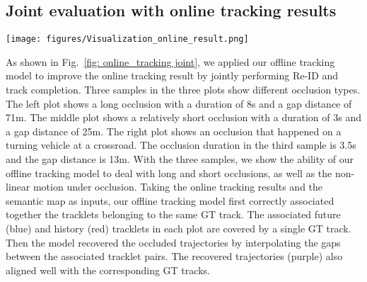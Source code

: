 \documentclass{article} \usepackage{iclr2023_conference,times}
\begin{document}
\subsection{Joint evaluation with online tracking results}
\begin{figure*}[htb!]
\centering
\texttt{[image: figures/Visualization\_online\_result.png]}
\caption{Qualitative results of the offline tracking model. In each sample, GT boxes are plotted as rectangles. Each GT track is represented by a unique color. To separate the output of the model from the GT tracks, we use arrows to represent the output poses from the model instead of rectangles. Red and blue arrows are the history and future tracklets matched by the offline Re-ID model. The recovered trajectories are plotted as purple arrows. The orange dotted lines are the lanes. In the background, the white area is drivable. The gray area in the right plot is the pedestrian crossing. The red cross is the average position of the ego vehicle during the occlusion. }
\label{fig: online_tracking joint}
\end{figure*}
As shown in Fig.~\ref{fig: online_tracking joint}, we applied our offline tracking model to improve the online tracking result by jointly performing Re-ID and track completion. Three samples in the three plots show different occlusion types. The left plot shows a long occlusion with a duration of 8s and a gap distance of 71m. The middle plot shows a relatively short occlusion with a duration of 3s and a gap distance of 25m. The right plot shows an occlusion that happened on a turning vehicle at a crossroad. The occlusion duration in the third sample is 3.5s and the gap distance is 13m. With the three samples, we show the ability of our offline tracking model to deal with long and short occlusions, as well as the non-linear motion under occlusion. Taking the online tracking results and the semantic map as inputs, our offline tracking model first correctly associated together the tracklets belonging to the same GT track. The associated future (blue) and history (red) tracklets in each plot are covered by a single GT track. Then the model recovered the occluded trajectories by interpolating the gaps between the associated tracklet pairs. The recovered trajectories (purple) also aligned well with the corresponding GT tracks.  
\end{document}

